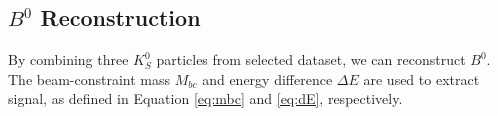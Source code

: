 \subsection{$B^0$  Reconstruction}

By combining three $K_S^0$ particles from selected dataset, we can reconstruct $B^0$. The beam-constraint mass $M_{bc}$ and energy difference $\Delta E$ are used to extract signal, as defined in Equation \ref{eq:mbc} and \ref{eq:dE}, respectively. 
